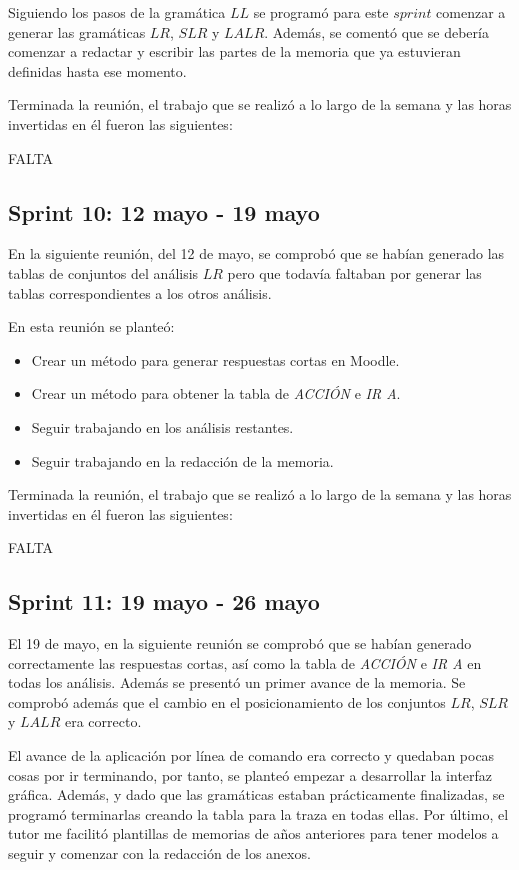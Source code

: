 Siguiendo los pasos de la gramática $LL$ se programó para este $sprint$ comenzar a generar las gramáticas $LR$, $SLR$ y $LALR$.
Además, se comentó que se debería comenzar a redactar y escribir las partes de la memoria que ya estuvieran definidas hasta ese momento.

Terminada la reunión, el trabajo que se realizó a lo largo de la semana y las horas invertidas en él fueron las siguientes:

FALTA

\subsection{Sprint 10: 12 mayo - 19 mayo}
En la siguiente reunión, del 12 de mayo, se comprobó que se habían generado las tablas de conjuntos del análisis $LR$ pero que todavía faltaban por generar las tablas correspondientes a los otros análisis.

En esta reunión se planteó:
\begin{itemize}
\item Crear un método para generar respuestas cortas en Moodle.
\item Crear un método para obtener la tabla de \textit{ACCIÓN} e \textit{IR A}.
\item Seguir trabajando en los análisis restantes.
\item Seguir trabajando en la redacción de la memoria.
\end{itemize}

Terminada la reunión, el trabajo que se realizó a lo largo de la semana y las horas invertidas en él fueron las siguientes:

FALTA
\subsection{Sprint 11: 19 mayo - 26 mayo}
El 19 de mayo, en la siguiente reunión se comprobó que se habían generado correctamente las respuestas cortas, así como la tabla de \textit{ACCIÓN} e \textit{IR A} en todas los análisis. 
Además se presentó un primer avance de la memoria.
Se comprobó además que el cambio en el posicionamiento de los conjuntos $LR$, $SLR$ y $LALR$ era correcto.

El avance de la aplicación por línea de comando era correcto y quedaban pocas cosas por ir terminando, por tanto, se planteó empezar a desarrollar la interfaz gráfica.
Además, y dado que las gramáticas estaban prácticamente finalizadas, se programó terminarlas creando la tabla para la traza en todas ellas.
Por último, el tutor me facilitó plantillas de memorias de años anteriores para tener modelos a seguir y comenzar con la redacción de los anexos.

